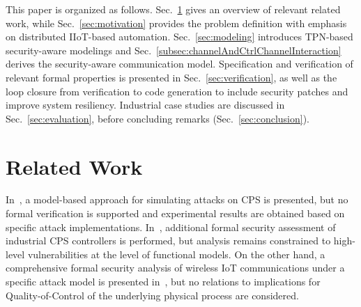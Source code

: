 %

This paper is organized as follows. Sec.~\ref{sec:relatedWork} gives an overview of relevant related work, while Sec.~\ref{sec:motivation} provides the problem definition with emphasis on distributed IIoT-based automation. Sec.~\ref{sec:modeling} introduces TPN-based security-aware modelings and Sec.~\ref{subsec:channelAndCtrlChannelInteraction} derives the security-aware communication model. Specification and verification of relevant formal properties is presented in Sec.~\ref{sec:verification}, as well as the loop closure from verification to code generation to include security patches and improve system resiliency. Industrial case studies are discussed in Sec.~\ref{sec:evaluation}, before concluding remarks (Sec.~\ref{sec:conclusion}).



\section{Related Work}
\label{sec:relatedWork}
In~\cite{faruque_cpsattacks}, a model-based approach for simulating attacks on CPS is presented, but no formal verification is supported and experimental results are obtained based on specific attack implementations. In~\cite{faruque_survivability}, additional formal security assessment of industrial CPS controllers is performed, but analysis remains constrained to high-level vulnerabilities at the level of functional models. On the other hand, a comprehensive formal security analysis of wireless IoT communications under a specific attack model is presented in~\cite{wirelessIOTsecurity}, but no relations to implications for Quality-of-Control of the underlying physical process are considered.

